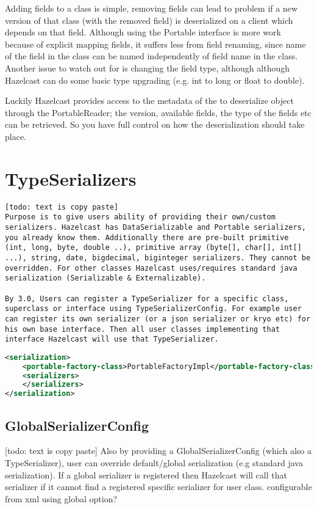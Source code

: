 Adding fields to a class is simple, removing fields can lead to problem if a new version of that class (with the removed field) is deserialized on a client which depends on that field. Although using the Portable interface is more work because of explicit mapping fields, it suffers less from field renaming, since name of the field in the class can be named independently of field name in the class. Another issue to watch out for is changing the field type, although although Hazelcast can do some basic type upgrading (e.g. int to long or float to double). 

Luckily Hazelcast provides access to the metadata of the to deserialize object through the PortableReader; the  version, available fields, the type of the fields etc can be retrieved. So you have full control on how the deserialization should take place. 

\section{TypeSerializers}

\begin{lstlisting}
[todo: text is copy paste]
Purpose is to give users ability of providing their own/custom serializers. Hazelcast has DataSerializable and Portable serializers, you already know them. Additionally there are pre-built primitive (int, long, byte, double ..), primitive array (byte[], char[], int[] ...), string, date, bigdecimal, biginteger serializers. They cannot be overridden. For other classes Hazelcast uses/requires standard java serialization (Serializable & Externalizable). 

By 3.0, Users can register a TypeSerializer for a specific class, superclass or interface using TypeSerializerConfig. For example user can register its own serializer (or a json serializer or kryo etc) for his own base interface. Then all user classes implementing that interface Hazelcast will use that TypeSerializer.
\end{lstlisting}

\begin{lstlisting}[language=xml]
<serialization>
    <portable-factory-class>PortableFactoryImpl</portable-factory-class>
    <serializers>
    </serializers>
</serialization>
\end{lstlisting}

\subsection{GlobalSerializerConfig}
[todo: text is copy paste]
Also by providing a GlobalSerializerConfig (which also a TypeSerializer), user can override default/global serialization (e.g standard java serialization). If a global serializer is registered then Hazelcast will call that serializer if it cannot find a registered specific serializer for user class. configurable from xml using global option?


